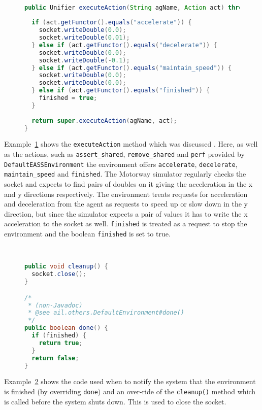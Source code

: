 \begin{figure}[htb]
\begin{ourexample}
\label{code:executeAction} \quad \\
\begin{lstlisting}[basicstyle=\sffamily,language=Java,style=easslisting]
public Unifier executeAction(String agName, Action act) throws AILexception {
		
  if (act.getFunctor().equals("accelerate")) {
    socket.writeDouble(0.0);
    socket.writeDouble(0.01);
  } else if (act.getFunctor().equals("decelerate")) {
    socket.writeDouble(0.0);
    socket.writeDouble(-0.1);
  } else if (act.getFunctor().equals("maintain_speed")) {
    socket.writeDouble(0.0);
    socket.writeDouble(0.0);
  } else if (act.getFunctor().equals("finished")) {
    finished = true;
  }
		
  return super.executeAction(agName, act);
}
\end{lstlisting}
\end{ourexample}
\end{figure}
Example~\ref{code:executeAction} shows the \texttt{executeAction} method which was discussed .  Here, as well as the actions, such as \lstinline{assert_shared}, \lstinline{remove_shared} and \lstinline{perf} provided by \texttt{DefaultEASSEnvironment} the environment offers \lstinline{accelerate}, \lstinline{decelerate}, \lstinline{maintain_speed} and \lstinline{finished}.  The Motorway simulator regularly checks the socket and expects to find pairs of doubles on it giving the acceleration in the x and y directions respectively.  The environment treats requests for acceleration and deceleration from the agent as requests to speed up or slow down in the y direction, but since the simulator expects a pair of values it has to write the x acceleration to the socket as well.  \lstinline{finished} is treated as a request to stop the environment and the boolean \texttt{finished} is set to true.

\begin{figure}[htb]
\begin{ourexample}
\label{code:stopping} \quad \\
\begin{lstlisting}[basicstyle=\sffamily,language=Java,style=easslisting]
public void cleanup() {
  socket.close();
}

/*
 * (non-Javadoc)
 * @see ail.others.DefaultEnvironment#done()
 */
public boolean done() {
  if (finished) {
    return true;
  }
  return false;
}
\end{lstlisting}
\end{ourexample}
\end{figure}
Example~\ref{code:stopping} shows the code used when to notify the system that the environment is finished (by overriding \texttt{done}) and an over-ride of the \texttt{cleanup()} method which is called before the system shuts down.  This is used to close the socket.

